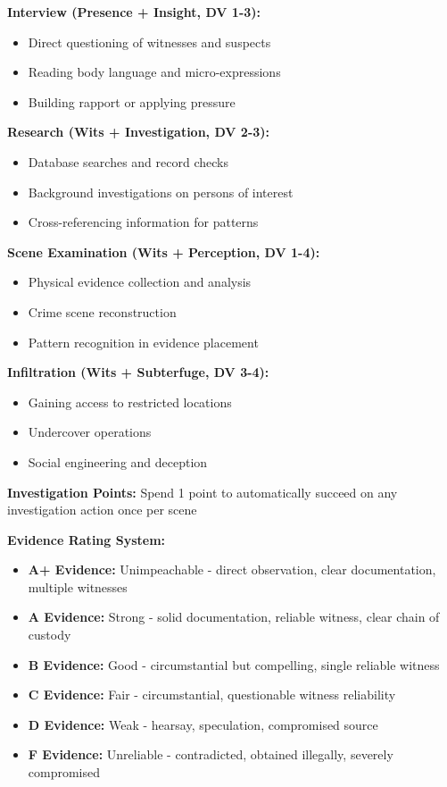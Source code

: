 \documentclass[11pt]{article}
\begin{document}
\textbf{Interview (Presence + Insight, DV 1-3):}
\begin{itemize}
    \item Direct questioning of witnesses and suspects
    \item Reading body language and micro-expressions
    \item Building rapport or applying pressure
\end{itemize}

\textbf{Research (Wits + Investigation, DV 2-3):}
\begin{itemize}
    \item Database searches and record checks
    \item Background investigations on persons of interest
    \item Cross-referencing information for patterns
\end{itemize}

\textbf{Scene Examination (Wits + Perception, DV 1-4):}
\begin{itemize}
    \item Physical evidence collection and analysis
    \item Crime scene reconstruction
    \item Pattern recognition in evidence placement
\end{itemize}

\textbf{Infiltration (Wits + Subterfuge, DV 3-4):}
\begin{itemize}
    \item Gaining access to restricted locations
    \item Undercover operations
    \item Social engineering and deception
\end{itemize}

\textbf{Investigation Points:} Spend 1 point to automatically succeed on any investigation action once per scene

\textbf{Evidence Rating System:}
\begin{itemize}
    \item \textbf{A+ Evidence:} Unimpeachable - direct observation, clear documentation, multiple witnesses
    \item \textbf{A Evidence:} Strong - solid documentation, reliable witness, clear chain of custody
    \item \textbf{B Evidence:} Good - circumstantial but compelling, single reliable witness
    \item \textbf{C Evidence:} Fair - circumstantial, questionable witness reliability
    \item \textbf{D Evidence:} Weak - hearsay, speculation, compromised source
    \item \textbf{F Evidence:} Unreliable - contradicted, obtained illegally, severely compromised
\end{itemize}
\end{document}
